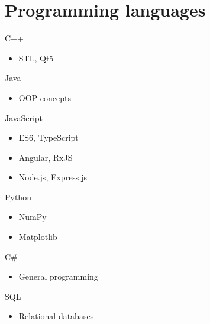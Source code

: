 \documentclass[11pt,a4paper,sans]{moderncv}			%
\begin{document}





\section{Programming languages}

\cvdoubleitem
{C++}{
\begin{itemize}
	\item STL, Qt5
\end{itemize}
}
{Java}{
\begin{itemize}
	\item OOP concepts
\end{itemize}
}

\cvdoubleitem
{JavaScript}{
\begin{itemize}
	\item ES6, TypeScript
	\item Angular, RxJS
	\item Node.js, Express.js
\end{itemize}}
{Python}{
\begin{itemize}
	\item NumPy
	\item Matplotlib
\end{itemize}
}

\cvdoubleitem
{C\#}{
\begin{itemize}
	\item General programming
\end{itemize}
}
{SQL}{
\begin{itemize}
	\item Relational databases
\end{itemize}
}

\end{document}
